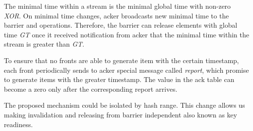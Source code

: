 The minimal time within a stream is the minimal global time with non-zero {\it XOR}. On minimal time changes, acker broadcasts new minimal time to the barrier and operations. Therefore, the barrier can release elements with global time {\it GT} once it received notification from acker that the minimal time within the stream is greater than {\it GT}.

To ensure that no fronts are able to generate item with the certain timestamp, each front periodically sends to acker special message called {\it report}, which promise to generate items with the greater timestamp. The value in the ack table can become a zero only after the corresponding report arrives.

The proposed mechanism could be isolated by hash range. This change allows us making invalidation and releasing from barrier independent also known as key readiness.
